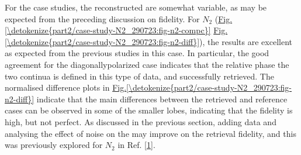 \documentclass[letterpaper,table,10pt,english]{jupyterBook}
\begin{document}
\sphinxAtStartPar
For the case studies, the reconstructed {\hyperref[\detokenize{backmatter/glossary:term-MF}]{}} are somewhat variable, as may be expected from the preceding discussion on fidelity. For \(N_2\) (\hyperref[\detokenize{part2/case-study-N2_290723:fig-n2-compc}]{Fig.\@ \ref{\detokenize{part2/case-study-N2_290723:fig-n2-compc}}} \sphinxhyphen{} \hyperref[\detokenize{part2/case-study-N2_290723:fig-n2-diff}]{Fig.\@ \ref{\detokenize{part2/case-study-N2_290723:fig-n2-diff}}}), the results are excellent \sphinxhyphen{} as expected from the previous studies in this case. In particular, the good agreement for the diagonally\sphinxhyphen{}polarized case indicates that the relative phase  the two continua is defined in this type of data, and successfully retrieved. The normalised difference plots in \hyperref[\detokenize{part2/case-study-N2_290723:fig-n2-diff}]{Fig.\@ \ref{\detokenize{part2/case-study-N2_290723:fig-n2-diff}}} indicate that the main differences between the retrieved and reference cases can be observed in some of the smaller lobes, indicating that the fidelity is high, but not perfect. As discussed in the previous section, adding data and analysing the effect of noise on the {\hyperref[\detokenize{backmatter/glossary:term-bootstrap-retrieval-protocol}]{}} may improve on the retrieval fidelity, and this was previously explored for \(N_2\) in Ref. {[}\hyperlink{cite.backmatter/bibliography:id775}{1}{]}.
\end{document}
